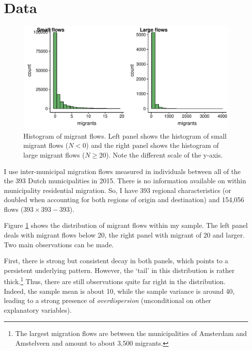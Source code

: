 \documentclass[fleqn,10pt]{SelfArx} %
\begin{document}
        \section{Data}

              \begin{figure}[ht!]\centering %
          \includegraphics[width=0.8\linewidth]{../fig/hist_mig.pdf}
          \caption{Histogram of migrant flows. Left panel shows the
            histogram of small migrant flows ($N<0$) and the right
            panel shows the histogram of large migrant flows
            ($N \geq 20$). Note the different scale of the y-axis.}
          \label{fig:hist_mig}
        \end{figure}

        I use inter-municipal migration flows measured in individuals between
        all of the the 393 Dutch municipalities in 2015. There is no information
        available on within municipality residential migration. So,
        I have 393 regional characteristics (or doubled when
        accounting for both regions of origin and destination) and
        154,056 flows ($393 \times 393 - 393$). 

        Figure \ref{fig:hist_mig} shows the distribution of migrant
        flows within my sample. The left panel deals with migrant
        flows below 20, the right panel with migrant of 20 and
        larger. Two main observations can be made.

        First, there is strong but consistent decay in both panels,
        which points to a persistent underlying pattern. However, the
        `tail' in this distribution is rather thick.\footnote{The
          largest migration flows are between the municipalities of
          Amsterdam and Amstelveen and amount to about 3,500
          migrants.} Thus, there are still observations quite far right in
        the distribution. Indeed, the sample mean is about 10, while the
        sample variance is around 40, leading to a strong presence of
        \emph{overdispersion} (unconditional on other explanatory variables).
\end{document}
